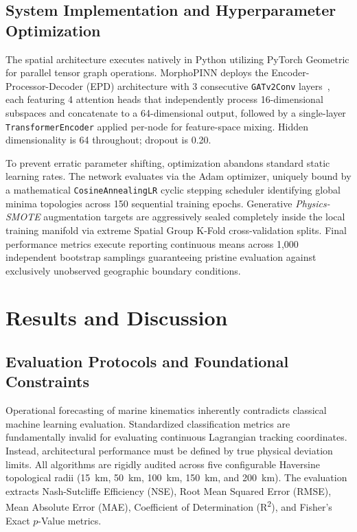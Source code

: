 \documentclass[conference]{IEEEtran}
\begin{document}
\subsection{System Implementation and Hyperparameter Optimization}
The spatial architecture executes natively in Python utilizing PyTorch Geometric for parallel tensor graph operations. MorphoPINN deploys the Encoder-Processor-Decoder (EPD) architecture with 3 consecutive \texttt{GATv2Conv} layers~\cite{brody2022attentive}, each featuring 4 attention heads that independently process 16-dimensional subspaces and concatenate to a 64-dimensional output, followed by a single-layer \texttt{TransformerEncoder} applied per-node for feature-space mixing. Hidden dimensionality is 64 throughout; dropout is 0.20.

To prevent erratic parameter shifting, optimization abandons standard static learning rates. The network evaluates via the Adam optimizer, uniquely bound by a mathematical \texttt{CosineAnnealingLR} cyclic stepping scheduler identifying global minima topologies across 150 sequential training epochs. Generative \textit{Physics-SMOTE} augmentation targets are aggressively sealed completely inside the local training manifold via extreme Spatial Group K-Fold cross-validation splits. Final performance metrics execute reporting continuous means across 1,000 independent bootstrap samplings guaranteeing pristine evaluation against exclusively unobserved geographic boundary conditions.

\section{Results and Discussion}

\subsection{Evaluation Protocols and Foundational Constraints}
Operational forecasting of marine kinematics inherently contradicts classical machine learning evaluation. Standardized classification metrics are fundamentally invalid for evaluating continuous Lagrangian tracking coordinates. Instead, architectural performance must be defined by true physical deviation limits. All algorithms are rigidly audited across five configurable Haversine topological radii (15~km, 50~km, 100~km, 150~km, and 200~km). The evaluation extracts Nash-Sutcliffe Efficiency (NSE), Root Mean Squared Error (RMSE), Mean Absolute Error (MAE), Coefficient of Determination (R\textsuperscript{2}), and Fisher's Exact $p$-Value metrics.
\end{document}
